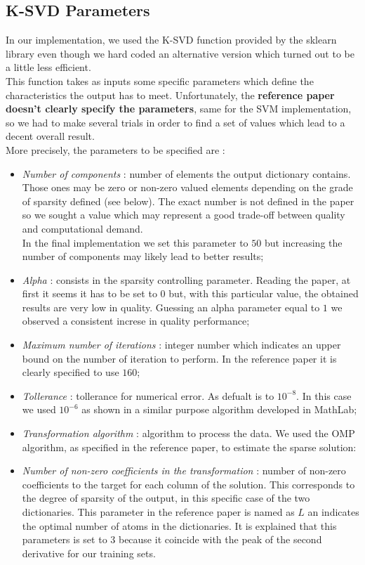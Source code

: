\subsection{K-SVD Parameters}
\label{cha:ksvd}
In our implementation, we used the K-SVD function provided by the sklearn library even though we hard coded an alternative version which turned out to be a little less efficient.\\
This function takes as inputs some specific parameters which define the characteristics the output has to meet. Unfortunately, the \textbf{reference paper doesn't clearly specify the parameters}, same for the SVM implementation, so we had to make several trials in order to find a set of values which lead to a decent overall result. \\
More precisely, the parameters to be specified are :
\begin{itemize}
    \item \textit{Number of components} : number of elements the output dictionary contains. Those ones may be zero or non-zero valued elements depending on the grade of sparsity defined (see below). The exact number is not defined in the paper so we sought a value which may represent a good trade-off between quality and computational demand.\\In the final implementation we set this parameter to $50$ but increasing the number of components may likely lead to better results;
    \item \textit{Alpha} : consists in the sparsity controlling parameter. Reading the paper, at first it seems it has to be set to $0$ but, with this particular value, the obtained results are very low in quality. Guessing an alpha parameter equal to $1$ we observed a consistent increse in quality performance;
    \item \textit{Maximum number of iterations} : integer number which indicates an upper bound on the number of iteration to perform. In the reference paper \cite{paper} it is clearly specified to use $160$;
    \item \textit{Tollerance} : tollerance for numerical error. As defualt is to $10^{-8}$. In this case we used $10^{-6}$ as shown in a similar purpose algorithm developed in MathLab;
    \item \textit{Transformation algorithm} : algorithm to process the data. We used the OMP algorithm, as specified in the reference paper, to estimate the sparse solution:
    \item \textit{Number of non-zero coefficients in the transformation} : number of non-zero coefficients to the target for each column of the solution. This corresponds to the degree of sparsity of the output, in this specific case of the two dictionaries. This parameter in the reference paper is named as $L$ an indicates the optimal number of atoms in the dictionaries. It is explained that this parameters is set to $3$ because it coincide with the peak of the second derivative for our training sets.
\end{itemize}

